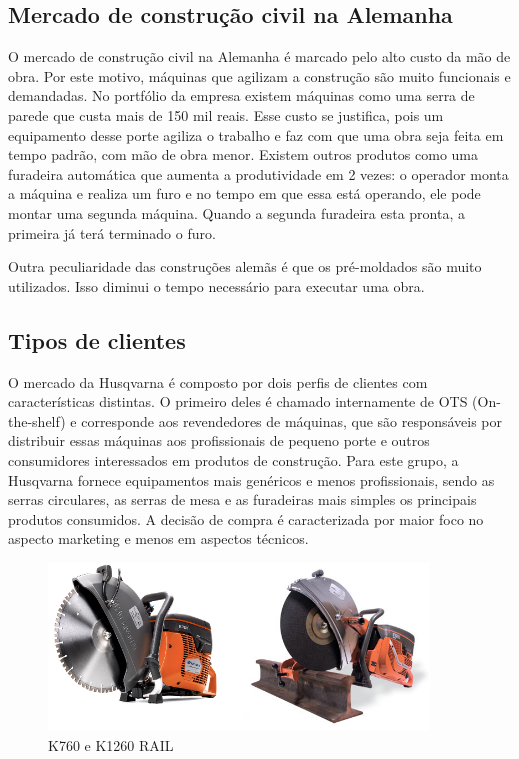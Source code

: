 \documentclass[12pt]{article}
\begin{document}
\subsection{Mercado de construção civil na Alemanha}

	O mercado de construção civil na Alemanha é marcado pelo alto custo da mão de obra. Por este motivo, máquinas que agilizam a construção são muito funcionais e demandadas. No portfólio da empresa existem máquinas como uma serra de parede que custa mais de 150 mil reais. Esse custo se justifica, pois um equipamento desse porte agiliza o trabalho e faz com que uma obra seja feita em tempo padrão, com mão de obra menor. Existem outros produtos como uma furadeira automática que aumenta a produtividade em 2 vezes: o operador monta a máquina e realiza um furo e no tempo em que essa está operando, ele pode montar uma segunda máquina. Quando a segunda furadeira esta pronta, a primeira já terá terminado o furo.

	Outra peculiaridade das construções alemãs é que os pré-moldados são muito utilizados. Isso diminui o tempo necessário para executar uma obra.

\subsection{Tipos de clientes}

	O mercado da Husqvarna é composto por dois perfis de clientes com características distintas. O primeiro deles é chamado internamente de OTS (On-the-shelf) e corresponde aos revendedores de máquinas, que são responsáveis por distribuir essas máquinas aos profissionais de pequeno porte e outros consumidores interessados em produtos de construção. Para este grupo, a Husqvarna fornece equipamentos mais genéricos e menos profissionais, sendo as serras circulares, as serras de mesa e as furadeiras mais simples os principais produtos consumidos. A decisão de compra é caracterizada por maior foco no aspecto marketing e menos em aspectos técnicos.

\begin{figure}[h!]
	\centering
	\includegraphics[width=0.9\textwidth]{img/k760-vs-k1260rail.png}
	\caption{K760 e K1260 RAIL}
	\label{fig:k700vsk1260}
\end{figure}
\end{document}
